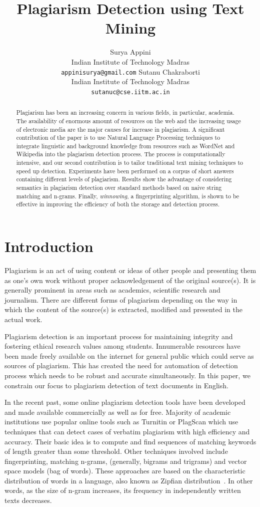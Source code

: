 \documentclass[11pt]{article}
\title{Plagiarism Detection using Text Mining}
\author{Surya Appini\\
  Indian Institute of Technology Madras \\
  {\tt appinisurya@gmail.com}  \And
  Sutanu Chakraborti\\
  Indian Institute of Technology Madras \\
  {\tt sutanuc@cse.iitm.ac.in}}
\date{}
\begin{document}
\maketitle
\begin{abstract}
  Plagiarism has been an increasing concern in various fields, in particular, academia. The availability of enormous amount of resources on the web and the increasing usage of electronic media are the major causes for increase in plagiarism. A significant contribution of the paper is to use Natural Language Processing techniques to integrate linguistic and background knowledge from resources such as WordNet and Wikipedia into the plagiarism detection process. The process is computationally intensive, and our second contribution is to tailor traditional text mining techniques to speed up detection. Experiments have been performed on a corpus of short answers containing different levels of plagiarism. Results show the advantage of considering semantics in plagiarism detection over standard methods based on naive string matching and n-grams. Finally, {\em  winnowing}, a fingerprinting algorithm, is shown to be effective in improving the efficiency of both the storage and detection process.
\end{abstract}

\section{Introduction}\label{1}

Plagiarism is an act of using content or ideas of other people and presenting them as one's own work without proper acknowledgement of the original source(s). It is generally prominent in areas such as academics, scientific research and journalism. There are different forms of plagiarism depending on the way in which the content of the source(s) is extracted, modified and presented in the actual work.

Plagiarism detection is an important process for maintaining integrity and fostering ethical research values among students. Innumerable resources have been made freely available on the internet for general public which could serve as sources of plagiarism. This has created the need for automation of detection process which needs to be robust and accurate simultaneously. In this paper, we constrain our focus to plagiarism detection of text documents in English.

In the recent past, some online plagiarism detection tools have been developed and made available commercially as well as for free. Majority of academic institutions use popular online tools such as Turnitin or PlagScan which use techniques that can detect cases of verbatim plagiarism with high efficiency and accuracy. Their basic idea is to compute and find sequences of matching keywords of length greater than some threshold. Other techniques involved include fingerprinting, matching n-grams, (generally, bigrams and trigrams) and vector space models (bag of words). These approaches are based on the characteristic distribution of words in a language, also known as Zipfian distribution~\cite{manning:99}. In other words, as the size of n-gram increases, its frequency in independently written texts decreases.
\end{document}
